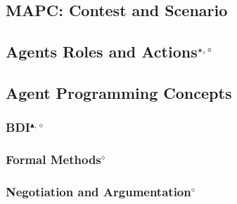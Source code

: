 \subsection{MAPC: Contest and Scenario}


\subsection[Agent Roles and Actions]{Agents Roles and Actions$^{\star,\circ}$}\label{fun:mapc_roles}


\subsection{Agent Programming Concepts}

\subsubsection[BDI]{BDI$^{\blacktriangle,\diamond}$}\label{fun:BDI}


\subsubsection[Formal Methods]{Formal Methods$^\diamond$}\label{fun:formal_methods}


\subsubsection[Negotiation and Argumentation]{Negotiation and Argumentation$^\diamond$}\label{fun:negotiation}


